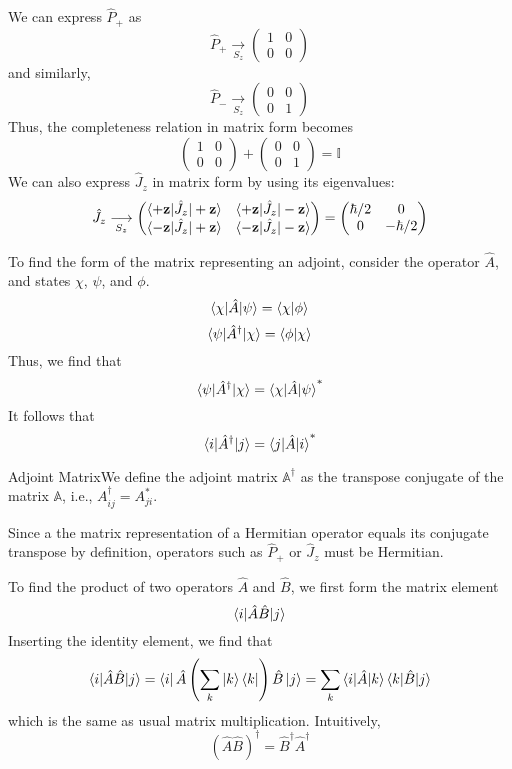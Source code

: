 \documentclass{report}
\newcommand{\dfn}[2]{\begin{Definition}[colbacktitle=red!75!black]{#1}{}#2\end{Definition}}
\begin{document}
We can express \(\hat P_+\) as
\[
	\hat P_+ \underset{S_z}\longrightarrow \begin{pmatrix} 1 & 0 \\ 0 & 0 \end{pmatrix} 
\] 
and similarly, 
\[
	\hat P_- \underset{S_z}\longrightarrow \begin{pmatrix} 0 & 0 \\ 0 & 1 \end{pmatrix} 
\] 
Thus, the completeness relation in matrix form becomes
\[
	\begin{pmatrix} 1 & 0 \\ 0 & 0 \end{pmatrix} + \begin{pmatrix} 0 & 0 \\ 0 & 1 \end{pmatrix} = \mathbb I
\] 
We can also express \(\hat J_z\) in matrix form by using its eigenvalues:
\[
	\hat J_z \underset{S_z}\longrightarrow \begin{pmatrix} \braket{+ \mathbf z | \hat J_z | + \mathbf z} & \braket{+ \mathbf z | \hat J_z | - \mathbf z } \\ \braket{- \mathbf z | \hat J_z | + \mathbf z} & \braket{- \mathbf z | \hat J_z | - \mathbf z} \end{pmatrix} = \begin{pmatrix} \hbar / 2 & 0 \\ 0 & -\hbar / 2 \end{pmatrix} 
\] 

To find the form of the matrix representing an adjoint, consider the operator \(\hat A\), and states \(\chi\), \(\psi\), and \(\phi\). 
\[
\braket{\chi | \hat A | \psi} = \braket{\chi | \phi}
\] 
\[
\braket{\psi | \hat A^ \dag | \chi} = \braket{\phi | \chi}
\] 
Thus, we find that 
\[
\braket{\psi | \hat A^ \dag | \chi} = \braket{\chi | \hat A | \psi}^*
\] 
It follows that 
\[
\braket{i | \hat A ^\dag | j} = \braket{ j | \hat A | i}^*
\] 
\dfn{Adjoint Matrix}{We define the adjoint matrix \(\mathbb A^\dag\) as the transpose conjugate of the matrix \(\mathbb A\), i.e., \(A^\dag_{ij} = A^*_{ji}.\)}
Since a the matrix representation of a Hermitian operator equals its conjugate transpose by definition, operators such as \(\hat P_+\) or \(\hat J_z\) must be Hermitian.

To find the product of two operators \(\hat A\) and \(\hat B\), we first form the matrix element
\[
\braket{i | \hat A \hat B | j}
\] 
Inserting the identity element, we find that
\[
\braket{i | \hat A \hat B | j} = \bra i \hat A \left( \sum_k \ket{k} \bra{k} \right) \hat B \ket{j} = \sum_k \braket{i | \hat A | k}\braket{k | \hat B | j} \]
which is the same as usual matrix multiplication. Intuitively, 
\[
	(\hat A \hat B)^\dag = \hat B^\dag \hat A^\dag
\] 
\end{document}

